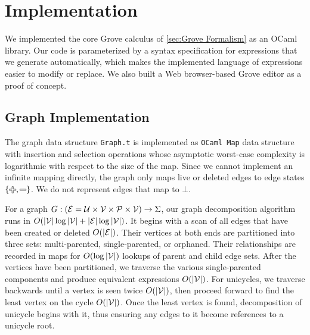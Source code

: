 
\section{Implementation}%
\label{sec:Implementation}






We implemented the core Grove calculus of \autoref{sec:Grove Formalism} as an OCaml library.
Our code is parameterized by a syntax specification for expressions that we generate automatically, which makes the implemented language of expressions easier to modify or replace.
We also built a Web browser-based Grove editor as a proof of concept.

\subsection{Graph Implementation}
\label{sec: Graph Implementation}
The graph data structure \texttt{Graph.t} is implemented as \texttt{OCaml Map} data structure with insertion and selection operations whose asymptotic worst-case complexity is logarithmic with respect to the size of the map. Since we cannot implement an infinite mapping directly, the graph only maps
live or deleted edges to edge states $\left\{\Plus, \Minus\right\}$. We do not represent edges that map to $\bot$.

For a graph $G : (\mathcal{E} = \mathcal{U} \times \mathcal{V} \times \mathcal{P} \times \mathcal{V}) \to \Sigma$, our graph decomposition algorithm runs in $O(\left\lvert\mathcal{V}\right\rvert \log \left\lvert\mathcal{V}\right\rvert + \left\lvert\mathcal{E}\right\rvert \log \left\lvert\mathcal{V}\right\rvert)$.
It begins with a scan of all edges that have been created or deleted $O(\left\lvert\mathcal{E}\right\rvert)$.
Their vertices at both ends are partitioned into three sets: multi-parented, single-parented, or orphaned.
Their relationships are recorded in maps for $O(\log \left\lvert\mathcal{V}\right\rvert)$ lookups of parent and child edge sets.
After the vertices have been partitioned, we traverse the various single-parented components and produce equivalent expressions $O(\left\lvert\mathcal{V}\right\rvert)$.
For unicycles, we traverse backwards until a vertex is seen twice $O(\left\lvert\mathcal{V}\right\rvert)$, then proceed forward to find the least vertex on the cycle $O(\left\lvert\mathcal{V}\right\rvert)$. Once the least vertex is found, decomposition of unicycle begins with it, thus ensuring any edges to it become references to a unicycle root.

